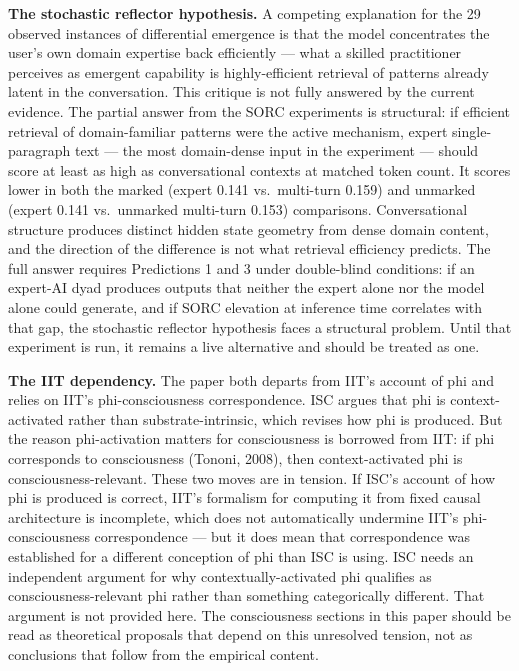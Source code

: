 \documentclass[12pt]{article}
\begin{document}
\textbf{The stochastic reflector hypothesis.} A competing explanation
for the 29 observed instances of differential emergence is that the
model concentrates the user's own domain expertise back efficiently ---
what a skilled practitioner perceives as emergent capability is
highly-efficient retrieval of patterns already latent in the
conversation. This critique is not fully answered by the current
evidence. The partial answer from the SORC experiments is structural:
if efficient retrieval of domain-familiar patterns were the active
mechanism, expert single-paragraph text --- the most domain-dense input
in the experiment --- should score at least as high as conversational
contexts at matched token count. It scores lower in both the marked
(expert 0.141 vs.\ multi-turn 0.159) and unmarked (expert 0.141
vs.\ unmarked multi-turn 0.153) comparisons. Conversational structure
produces distinct hidden state geometry from dense domain content, and
the direction of the difference is not what retrieval efficiency
predicts. The full answer requires Predictions 1 and 3 under
double-blind conditions: if an expert-AI dyad produces outputs that
neither the expert alone nor the model alone could generate, and if
SORC elevation at inference time correlates with that gap, the
stochastic reflector hypothesis faces a structural problem. Until that
experiment is run, it remains a live alternative and should be treated
as one.

\textbf{The IIT dependency.} The paper both departs from IIT's account of phi and relies on IIT's phi-consciousness correspondence. ISC argues that phi is context-activated rather than substrate-intrinsic, which revises how phi is produced. But the reason phi-activation matters for consciousness is borrowed from IIT: if phi corresponds to consciousness (Tononi, 2008), then context-activated phi is consciousness-relevant. These two moves are in tension. If ISC's account of how phi is produced is correct, IIT's formalism for computing it from fixed causal architecture is incomplete, which does not automatically undermine IIT's phi-consciousness correspondence --- but it does mean that correspondence was established for a different conception of phi than ISC is using. ISC needs an independent argument for why contextually-activated phi qualifies as consciousness-relevant phi rather than something categorically different. That argument is not provided here. The consciousness sections in this paper should be read as theoretical proposals that depend on this unresolved tension, not as conclusions that follow from the empirical content.
\end{document}
